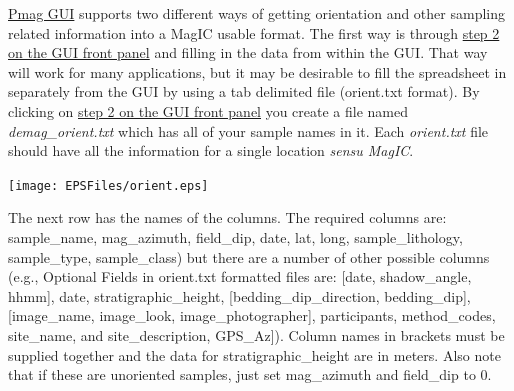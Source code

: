 \documentclass[11pt]{book}
\begin{document}
{{\href{#pmag_gui.py}{Pmag GUI}  supports two different ways of getting orientation and other sampling related information into a MagIC usable format.  The first way is through \href{#orient}{step 2 on the GUI front panel} and filling in the data from within the GUI.  That way will work for many applications, but it may be desirable to fill the spreadsheet in separately from the GUI by using  a tab delimited file (orient.txt format).   By clicking on  \href{#orient}{step 2 on the GUI front panel}  you create a file named {\it demag\_orient.txt}  which has all of your sample names in it.   Each {\it orient.txt} file should  have all the information for a single location {\it sensu MagIC}.


  \texttt{[image: EPSFiles/orient.eps]}

 The next row has the names of the columns.  The required columns are:  sample\_name, mag\_azimuth, field\_dip, date, lat, long, sample\_lithology, sample\_type, sample\_class) but there are a number of other possible columns (e.g., Optional Fields in orient.txt formatted files are: [date, shadow\_angle, hhmm], date, stratigraphic\_height, [bedding\_dip\_direction, bedding\_dip], [image\_name, image\_look, image\_photographer], participants, method\_codes, site\_name, and site\_description, GPS\_Az]).  Column names in brackets must be supplied together and the data for stratigraphic\_height are in meters.  Also note that if these are unoriented samples, just set mag\_azimuth and field\_dip to 0.


}}
\end{document}
